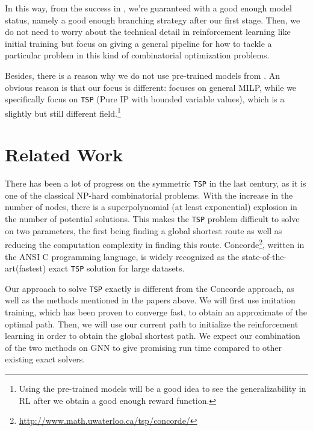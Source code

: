 \documentclass{article}
\begin{document}
In this way, from the success in \cite{GasseCFCL19}, we're guaranteed with a good enough model status, namely a good enough branching strategy after our first stage. Then, we do not need to worry about the
technical detail in reinforcement learning like initial training but focus on giving a general pipeline for how to tackle a particular problem in this kind of combinatorial optimization problems.

Besides, there is a reason why we do not use pre-trained models from \cite{GasseCFCL19}. An obvious reason is that our focus is different: \cite{GasseCFCL19} focuses on general MILP, while we specifically focus on
\texttt{TSP} (Pure IP with bounded variable values), which is a slightly but still different field.\footnote{Using the pre-trained models will be a good idea to see the generalizability in RL after we obtain a good enough reward function.}

\section{Related Work}


There has been a lot of progress on the symmetric \texttt{TSP} in the last century, as it is one of the
classical NP-hard combinatorial problems. With the increase in the number of nodes, there is a
superpolynomial (at least exponential) explosion in the number of potential solutions. This makes the
\texttt{TSP} problem difficult to solve on two parameters, the first being finding a global shortest route as
well as reducing the computation complexity in finding this route. Concorde\footnote{\url{http://www.math.uwaterloo.ca/tsp/concorde/}}, written in the ANSI C programming language, is widely recognized as the state-of-the-art(fastest) exact \texttt{TSP} solution for large datasets.


Our approach to solve \texttt{TSP} exactly is different from the Concorde approach, as well as the methods mentioned in the papers above. We will first use imitation training, which has been proven to converge fast, to obtain an approximate of the optimal path. Then, we will use our current path to initialize the reinforcement learning in order to obtain the global shortest path. We expect our combination of the two methods on GNN to give promising run time compared to other existing exact solvers.
\end{document}
